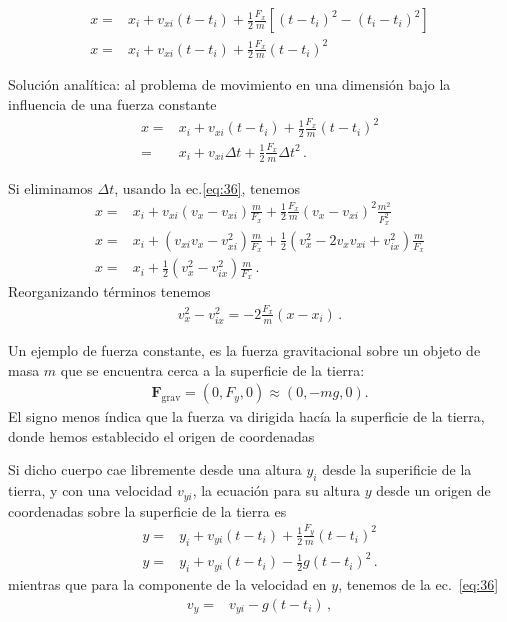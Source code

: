 \begin{align}
  x=&x_i+v_{xi}(t-t_i)+\frac{1}{2}\frac{F_x}{m}
  \left[
    (t-t_i)^2-(t_i-t_i)^2
  \right]\nonumber\\
  x=&x_i+v_{xi}(t-t_i)+\frac{1}{2}\frac{F_x}{m}(t-t_i)^2
\end{align}
\begin{frame}
  \begin{block}%
{Solución analítica:} al problema de movimiento en una dimensión bajo la influencia de una fuerza constante
\begin{align}
   x=&x_i+v_{xi}(t-t_i)+\frac{1}{2}\frac{F_x}{m}(t-t_i)^2\nonumber\\
   =&x_i+v_{xi}\Delta t+\frac{1}{2}\frac{F_x}{m}\Delta t^2\,.
\end{align}
  \end{block}
\end{frame}

Si eliminamos $\Delta t$, usando la ec.\eqref{eq:36}, tenemos
\begin{align*}
  x=&x_i +v_{xi}(v_x-v_{xi})\frac{m}{F_x}+\frac{1}{2}\frac{F_x}{m}(v_x-v_{xi})^2\frac{m^2}{F_x^2}\nonumber\\
  x=&x_i +(v_{xi}v_x-v_{xi}^2)\frac{m}{F_x}+\frac{1}{2}(v_x^2-2 v_x v_{xi}+v_{ix}^2)\frac{m}{F_x}\nonumber\\
x=&x_i +\frac{1}{2}(v_x^2-v_{ix}^2)\frac{m}{F_x}\,.
\end{align*}
Reorganizando términos tenemos
\begin{align}
  \label{eq:tray0}
  v_x^2-v_{ix}^2=-2\frac{F_x}{m}(x-x_i)\,.
\end{align}


Un ejemplo de fuerza constante, es la fuerza gravitacional sobre un objeto de masa $m$ que se encuentra cerca a la superficie de la tierra:
\begin{align}
  \label{eq:29}
  \mathbf{F}_{\text{grav}}=(0,F_y,0)\approx(0,-mg,0).
\end{align}
El signo menos índica que la fuerza va dirigida hacía la superficie de la tierra, donde hemos establecido el origen de coordenadas

Si dicho cuerpo cae libremente desde una altura $y_i$ desde la superificie de la tierra, y con una velocidad $v_{yi}$, la ecuación para su altura $y$ desde un origen de coordenadas sobre la superficie de la tierra es
\begin{align}
\label{eq:31}
   y=&y_i+v_{yi}(t-t_i)+\frac{1}{2}\frac{F_y}{m}(t-t_i)^2\nonumber\\
   y=&y_i+v_{yi}(t-t_i)-\frac{1}{2}g(t-t_i)^2\,.
\end{align}
mientras que para la componente de la velocidad en $y$, tenemos de la ec.~\eqref{eq:36}
\begin{align}
  \label{eq:37}
    v_y =&v_{yi}-g(t-t_i)\,,
\end{align}

